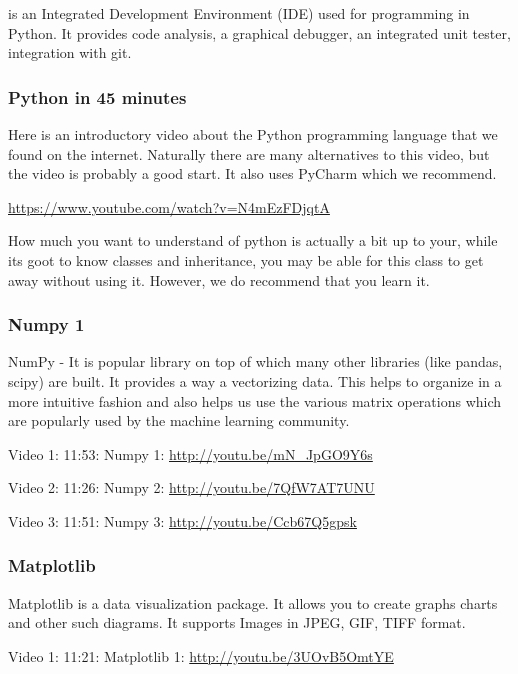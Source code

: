 is an Integrated Development Environment (IDE) used for programming in
Python. It provides code analysis, a graphical debugger, an integrated
unit tester, integration with git.


\subsubsection{Python in 45 minutes}\label{python-in-45-minutes}

Here is an introductory video about the Python programming language that
we found on the internet. Naturally there are many alternatives to this
video, but the video is probably a good start. It also uses PyCharm
which we recommend.

\url{https://www.youtube.com/watch?v=N4mEzFDjqtA}

How much you want to understand of python is actually a bit up to your,
while its goot to know classes and inheritance, you may be able for this
class to get away without using it. However, we do recommend that you
learn it.

\subsubsection{Numpy 1}\label{numpy-1}

NumPy - It is popular library on top of which many other libraries (like
pandas, scipy) are built. It provides a way a vectorizing data. This
helps to organize in a more intuitive fashion and also helps us use the
various matrix operations which are popularly used by the machine
learning community.

Video 1: 11:53: Numpy 1: \url{http://youtu.be/mN_JpGO9Y6s}

Video 2: 11:26: Numpy 2: \url{http://youtu.be/7QfW7AT7UNU}

Video 3: 11:51: Numpy 3: \url{http://youtu.be/Ccb67Q5gpsk}

\subsubsection{Matplotlib}\label{matplotlib}

Matplotlib is a data visualization package. It allows you to create
graphs charts and other such diagrams. It supports Images in JPEG, GIF,
TIFF format.

Video 1: 11:21: Matplotlib 1: \url{http://youtu.be/3UOvB5OmtYE}


